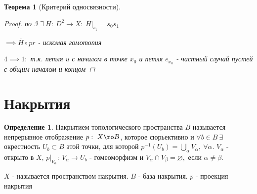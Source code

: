 \documentclass[a4paper]{article}
\newtheorem*{theorem}{Теорема}
\theoremstyle{definition}
\newtheorem*{definition}{Определение}
\theoremstyle{remark}
\begin{document}
\begin{tcolorbox}
\begin{theorem}[Критерий односвязности]
\begin{proof}
            по 3 $ \exists \ \overline{H} : \ D^2 \to X: \ \overline{H}|_{s_1}
            = s_0 \overline{s_1}$ 

            $ \implies \overline{H} \circ pr $ - искомая гомотопия

            $ 4 \implies 1: $ т.к. петля $ u $ с началом в точке $ x_0 $ и 
            петля $ e_{x_0} $ - частный случай пустей с общим началом и концом
        \end{proof}
    \end{theorem}
\end{tcolorbox}

\section*{\centering Накрытия}

\begin{tcolorbox}
\begin{definition}
    Накрытием топологического пространства $ B $ называется непрерывное отображение
    $ p: \ X \ro B $, которое сюрьективно и $ \forall b \in B \ \exists $ окрестность
    $ U_b \subset B $ этой точки, для которой $ p^{-1}(U_b) = \bigcup_{\alpha}
    V_{\alpha}, \ \forall \alpha$. $ V_{\alpha} $ - открыто в $ X $,
    $ p|_{V_{\alpha}} : \ V_{\alpha} \to U_b $ - гомеоморфизм и $ V_{\alpha}
    \cap V_{\beta} = \varnothing,$ если $ \alpha \neq \beta $.

    $ X $ - называется пространством накрытия. $ B $ - база накрытия.
    $ p $ - проекция накрытия
\end{definition}
\end{tcolorbox}
\end{document}
